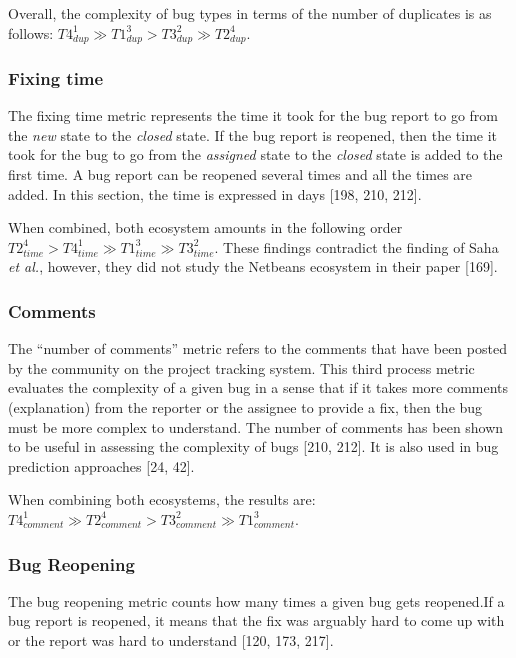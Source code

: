 \documentclass[12pt]{report}
\begin{document}
Overall, the complexity of bug types in terms of the number of
duplicates is as follows:
\(T4_{dup}^{1} \gg T1_{dup}^{3} > T3_{dup}^{2} \gg T2_{dup}^{4}\).

\subsubsection{Fixing time}\label{fixing-time}

The fixing time metric represents the time it took for the bug report to
go from the \emph{new} state to the \emph{closed} state. If the bug
report is reopened, then the time it took for the bug to go from the
\emph{assigned} state to the \emph{closed} state is added to the first
time. A bug report can be reopened several times and all the times are
added. In this section, the time is expressed in days {[}198, 210,
212{]}.

When combined, both ecosystem amounts in the following order
\(T2_{time}^4 > T4_{time}^1 \gg T1_{time}^3 \gg T3_{time}^2\). These
findings contradict the finding of Saha \emph{et al.}, however, they did
not study the Netbeans ecosystem in their paper {[}169{]}.

\subsubsection{Comments}\label{comments}

The ``number of comments'' metric refers to the comments that have been
posted by the community on the project tracking system. This third
process metric evaluates the complexity of a given bug in a sense that
if it takes more comments (explanation) from the reporter or the
assignee to provide a fix, then the bug must be more complex to
understand. The number of comments has been shown to be useful in
assessing the complexity of bugs {[}210, 212{]}. It is also used in bug
prediction approaches {[}24, 42{]}.

When combining both ecosystems, the results are:
\(T4_{comment}^1 \gg T2_{comment}^4 > T3_{comment}^2 \gg T1_{comment}^3\).

\subsubsection{Bug Reopening}\label{bug-reopening}

The bug reopening metric counts how many times a given bug gets
reopened.If a bug report is reopened, it means that the fix was arguably
hard to come up with or the report was hard to understand {[}120, 173,
217{]}.
\end{document}
